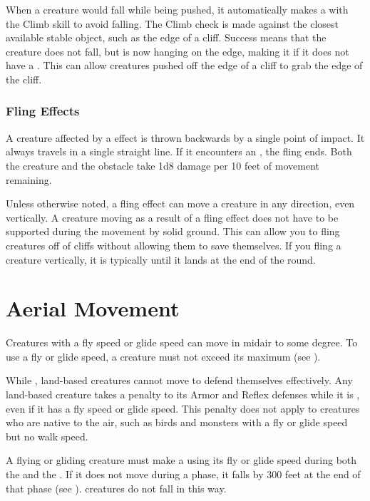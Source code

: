       When a creature would fall while being pushed, it automatically makes a  with the Climb skill to avoid falling.
      The Climb check is made against the closest available stable object, such as the edge of a cliff.
      Success means that the creature does not fall, but is now hanging on the edge, making it \unsteady if it does not have a .
      This can allow creatures pushed off the edge of a cliff to grab the edge of the cliff.

    \subsubsection{Fling Effects}\label{Flin Effects}
      A creature affected by a  effect is thrown backwards by a single point of impact.
      It always travels in a single straight line.
      If it encounters an , the fling ends.
      Both the creature and the obstacle take 1d8 damage per 10 feet of movement remaining.

      Unless otherwise noted, a fling effect can move a creature in any direction, even vertically.
      A creature moving as a result of a fling effect does not have to be supported during the movement by solid ground.
      This can allow you to fling creatures off of cliffs without allowing them to save themselves.
      If you fling a creature vertically, it is typically \unsteady until it lands at the end of the round.

\section{Aerial Movement}\label{Aerial Movement}
  Creatures with a fly speed or glide speed can move in midair to some degree.
  To use a fly or glide speed, a creature must not exceed its maximum  (see ).

  While , land-based creatures cannot move to defend themselves effectively.
  Any land-based creature takes a  penalty to its Armor and Reflex defenses while it is , even if it has a fly speed or glide speed.
  This penalty does not apply to creatures who are native to the air, such as birds and monsters with a fly or glide speed but no walk speed.

  A flying or gliding creature must make a  using its fly or glide speed during both the  and the .
  If it does not move during a phase, it falls by 300 feet at the end of that phase (see ).
   creatures do not fall in this way.

